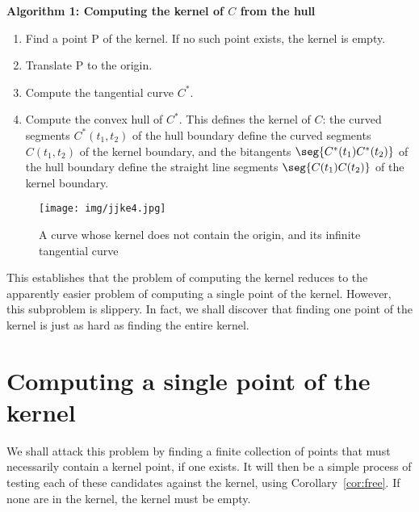\documentclass[12pt]{article}
\begin{document}
\centerline{{\bf Algorithm 1: Computing the kernel of $C$ from the hull}}

\begin{enumerate}
\item 	Find a point P of the kernel.  If no such point exists, 
	the kernel is empty.
\item   Translate P to the origin.
\item	Compute the tangential curve $C^*$.
\item	Compute the convex hull of $C^*$.
	This defines the kernel of $C$:
	the curved segments $C^*(t_1,t_2)$ of the hull boundary define
	the curved segments $C(t_1,t_2)$ of the kernel boundary,
	and the bitangents $\seg{C^*(t_1)C^*(t_2)}$ of the hull boundary 
	define the straight line segments $\seg{C(t_1)C(t_2)}$ of the
	kernel boundary.
\end{enumerate}

\begin{figure}[h]
\begin{center}
\texttt{[image: img/jjke4.jpg]}
\end{center}
\caption{A curve whose kernel does not contain the origin, and its infinite tangential curve}
\label{fig:originNotInKernel}
\end{figure}


This establishes that the problem of computing the kernel reduces to the 
apparently easier problem of computing a single point of the kernel.
However, this subproblem is slippery.
In fact, we shall discover that finding one point of the kernel
is just as hard as finding the entire kernel.


\section{Computing a single point of the kernel}
\label{sec:candidate}

We shall attack this problem by finding 
a finite collection of points that must necessarily contain
a kernel point, if one exists.
It will then be a simple process of testing each of these candidates against
the kernel, using Corollary~\ref{cor:free}.
If none are in the kernel, the kernel must be empty.
\end{document}
